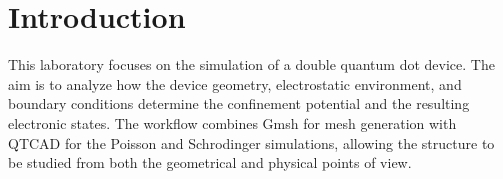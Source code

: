 \chapter{Introduction}

This laboratory focuses on the simulation of a double quantum dot device. The aim is to analyze how the device geometry, electrostatic environment, and boundary conditions determine the confinement potential and the resulting electronic states. The workflow combines Gmsh for mesh generation with QTCAD for the Poisson and Schrodinger simulations, allowing the structure to be studied from both the geometrical and physical points of view.
